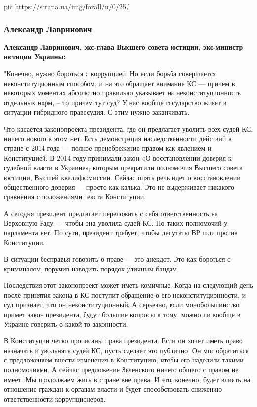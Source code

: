 \ifcmt
pic https://strana.ua/img/forall/u/0/25/%
\fi

\subsubsection{Александр Лавринович}

{\bfseries 
Александр Лавринович, экс-глава Высшего совета юстиции, экс-министр юстиции Украины:
}

"Конечно, нужно бороться с коррупцией. Но если борьба совершается
неконституционным способом, и на это обращает внимание КС --- причем в некоторых
моментах абсолютно правильно указывает на неконституционность отдельных норм, –
то причем тут суд? У нас вообще государство живет в ситуации гибридного
правосудия. С этим нужно заканчивать.

Что касается законопроекта президента, где он предлагает уволить всех судей КС,
ничего нового в этом нет. Есть демонстрация наследственности действий в стране
с 2014 года --- полное пренебрежение правом как явлением и Конституцией. В 2014
году принимали закон «О восстановлении доверия к судебной власти в Украине»,
которым прекратили полномочия Высшего совета юстиции, Высшей квалифкомиссии.
Сейчас опять речь идет о восстановлении общественного доверия --- просто как
калька. Это не выдерживает никакого сравнения с положениями текста Конституции.

А сегодня президент предлагает переложить с себя ответственность на Верховную
Раду --- чтобы она уволила судей КС. Но таких полномочий у парламента нет. По
сути, президент требует, чтобы депутаты ВР шли против Конституции.

В ситуации бесправья говорить о праве --- это анекдот.  Это как бороться с
криминалом, поручив наводить порядок уличным бандам.

Последствия этот законопроект может иметь комичные. Когда на следующий день
после принятия закона в КС поступит обращение о его неконституционности, и суд
признает, что он неконституционный. А серьезно, если монобольшинство примет
закон президента, будут большие вопросы к тому, можно ли вообще в Украине
говорить о какой-то законности.

В Конституции четко прописаны права президента. Если он хочет иметь право
назначать и увольнять судей КС, пусть сделает это публично. Он мог обратиться с
предложением внести изменения в Конституцию, чтобы его наделили такими
полномочиями. А сейчас  предложение Зеленского ничего общего с правом не имеет.
Мы продолжаем жить в стране вне права. И это, конечно, будет влиять на
отношение граждан к органам власти и будет способствовать снижению
ответственности коррупционеров.

